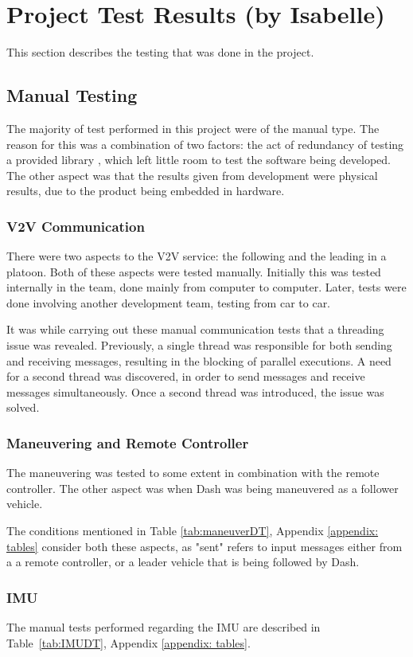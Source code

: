 \documentclass[12pt]{article}
\begin{document}
\section{Project Test Results (by Isabelle)}\label{project test results}
This section describes the testing that was done in the project.
\subsection{Manual Testing}
The majority of test performed in this project were of the manual type. The reason for this was a combination of two factors: the act of redundancy of testing a provided library \cite{libcluon}, which left little room to test the software being developed. The other aspect was that the results given from development were physical results, due to the product being embedded in hardware.

\subsubsection{V2V Communication}
There were two aspects to the V2V service: the following and the leading in a platoon. Both of these aspects were tested manually. Initially this was tested internally in the team, done mainly from computer to computer. Later, tests were done involving another development team, testing from car to car. 

It was while carrying out these manual communication tests that a threading issue was revealed. Previously, a single thread was responsible for both sending and receiving messages, resulting in the blocking of parallel executions. A need for a second thread was discovered, in order to send messages and receive messages simultaneously. Once a second thread was introduced, the issue was solved.   

\subsubsection{Maneuvering and Remote Controller}
The maneuvering was tested to some extent in combination with the remote controller. The other aspect was when Dash was being maneuvered as a follower vehicle. 

The conditions mentioned in Table \ref{tab:maneuverDT}, Appendix \ref{appendix: tables} consider both these aspects, as "sent" refers to input messages either from a a remote controller, or a leader vehicle that is being followed by Dash. 

\subsubsection{IMU}
The manual tests performed regarding the IMU are described in Table~\ref{tab:IMUDT}, Appendix \ref{appendix: tables}.
\end{document}
